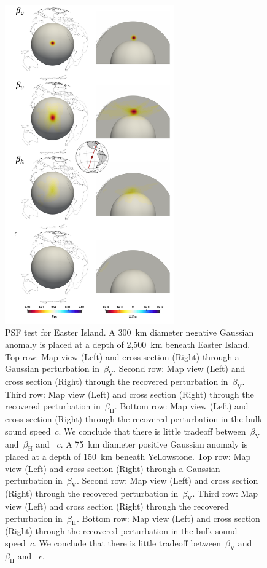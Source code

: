 \documentclass[extra,mreferee]{gji}
\begin{document}
\begin{figure}
  \centering
  \includegraphics[width=0.65\textwidth]{figures/psf/easter.pdf}
  \caption{\small{PSF test for Easter Island.
  A 300~km diameter negative Gaussian anomaly is placed at a depth of 2,500~km beneath Easter Island.
  Top row: Map view (Left) and cross section (Right) through a Gaussian perturbation in~$\beta_\mathrm{V}$.
  Second row: Map view (Left) and cross section (Right) through the recovered perturbation in~$\beta_\mathrm{V}$.
  Third row: Map view (Left) and cross section (Right) through the recovered perturbation in~$\beta_\mathrm{H}$.
  Bottom row: Map view (Left) and cross section (Right) through the recovered perturbation in the bulk sound speed~$c$. We conclude that there is little tradeoff between~$\beta_\mathrm{V}$ and~$\beta_\mathrm{H}$ and ~$c$.  A 75~km diameter positive Gaussian anomaly is placed at a depth of 150~km beneath Yellowstone.
  Top row: Map view (Left) and cross section (Right) through a Gaussian perturbation in~$\beta_\mathrm{V}$.
  Second row: Map view (Left) and cross section (Right) through the recovered perturbation in~$\beta_\mathrm{V}$.
  Third row: Map view (Left) and cross section (Right) through the recovered perturbation in~$\beta_\mathrm{H}$.
  Bottom row: Map view (Left) and cross section (Right) through the recovered perturbation in the bulk sound speed~$c$. We conclude that there is little tradeoff between~$\beta_\mathrm{V}$ and~$\beta_\mathrm{H}$ and ~$c$.}}
  \label{fig:psf_easter}
\end{figure}
\end{document}
